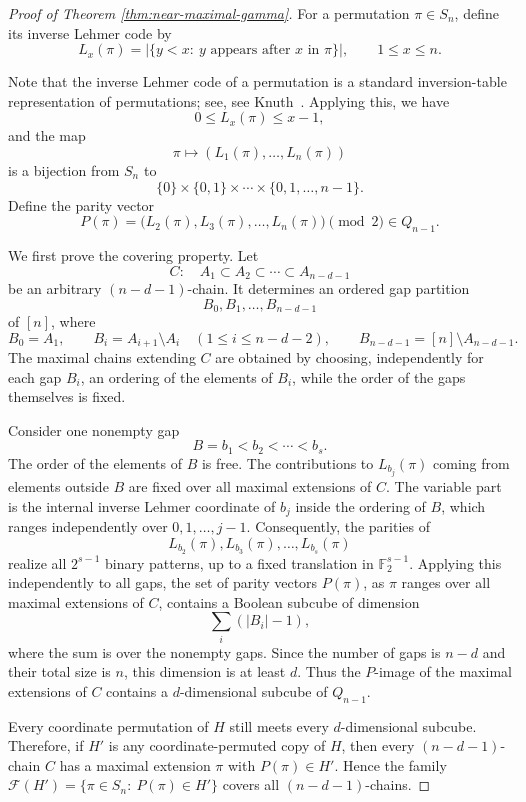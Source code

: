 \documentclass[11pt]{article}
\theoremstyle{definition}
\theoremstyle{remark}
\begin{document}
\begin{proof}[Proof of Theorem \ref{thm:near-maximal-gamma}]
For a permutation $\pi\in S_n$, define its inverse Lehmer code by
\[
L_x(\pi)=
\bigl|\{y<x:\ y\text{ appears after }x\text{ in }\pi\}\bigr|,
\qquad 1\le x\le n.
\]   

Note that the  inverse Lehmer code of a permutation is a standard inversion-table representation of permutations; see, see Knuth~\cite{Knuth11}.
 Applying this, we have
\[
0\le L_x(\pi)\le x-1,
\]
and the map
\[
\pi\mapsto (L_1(\pi),\ldots,L_n(\pi))
\]
is a bijection from $S_n$ to
\[
\{0\}\times\{0,1\}\times\cdots\times\{0,1,\ldots,n-1\}.
\]
Define the parity vector
\[
P(\pi)=
\bigl(L_2(\pi),L_3(\pi),\ldots,L_n(\pi)\bigr)\pmod 2
\in Q_{n-1}.
\]

We first prove the covering property. Let
\[
C:\quad A_1\subset A_2\subset\cdots\subset A_{n-d-1}
\]
be an arbitrary $(n-d-1)$-chain. It determines an ordered gap
partition
\[
B_0,B_1,\ldots,B_{n-d-1}
\]
of $[n]$, where
\[
B_0=A_1,\qquad
B_i=A_{i+1}\setminus A_i\quad (1\le i\le n-d-2),
\qquad
B_{n-d-1}=[n]\setminus A_{n-d-1}.
\]
The maximal chains extending $C$ are obtained by choosing, independently
for each gap $B_i$, an ordering of the elements of $B_i$, while the
order of the gaps themselves is fixed.

Consider one nonempty gap
\[
B={b_1<b_2<\cdots<b_s}.
\]
The order of the elements of $B$ is free. The contributions to
$L_{b_j}(\pi)$ coming from elements outside $B$ are fixed over all
maximal extensions of $C$. The variable part is the internal inverse
Lehmer coordinate of $b_j$ inside the ordering of $B$, which ranges
independently over $0,1,\ldots,j-1$.
Consequently, the parities of
\[
L_{b_2}(\pi),L_{b_3}(\pi),\ldots,L_{b_s}(\pi)
\]
realize all $2^{s-1}$ binary patterns, up to a fixed translation in
$\mathbb F_2^{s-1}$. Applying this independently to all gaps, the set
of parity vectors $P(\pi)$, as $\pi$ ranges over all maximal
extensions of $C$, contains a Boolean subcube of dimension
\[
\sum_i (|B_i|-1),
\]
where the sum is over the nonempty gaps. Since the number of gaps is
$n-d$ and their total size is $n$, this dimension is at least $d$.
Thus the $P$-image of the maximal extensions of $C$ contains a
$d$-dimensional subcube of $Q_{n-1}$.

Every coordinate permutation of $H$ still meets every $d$-dimensional
subcube. Therefore, if $H'$ is any coordinate-permuted copy of $H$,
then every $(n-d-1)$-chain $C$ has a maximal extension $\pi$ with
$P(\pi)\in H'$.
Hence the family
$\mathcal F(H')
=
\{\pi\in S_n:\ P(\pi)\in H'\}$
covers all $(n-d-1)$-chains.


\end{proof}
\end{document}

